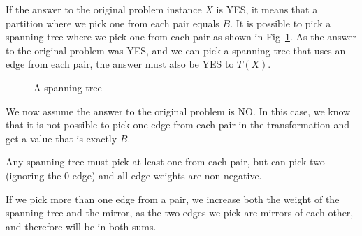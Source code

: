 If the answer to the original problem instance $X$ is YES, it means that a partition where we pick one from each pair equals $B$. It is possible to pick a spanning tree where we pick one from each pair as shown in Fig~\ref{fig:transform3}. As the answer to the original problem was YES, and we can pick a spanning tree that uses an edge from each pair, the answer must also be YES to $T(X)$.

\begin{figure}[htb]
\caption{A spanning tree}
\label{fig:transform3}
\end{figure}

We now assume the answer to the original problem is NO. In this case, we know that it is not possible to pick one edge from each pair in the transformation and get a value that is exactly $B$. 

Any spanning tree must pick at least one from each pair, but can pick two (ignoring the $0$-edge) and all edge weights are non-negative. 

If we pick more than one edge from a pair, we increase both the weight of the spanning tree and the mirror, as the two edges we pick are mirrors of each other, and therefore will be in both sums.

